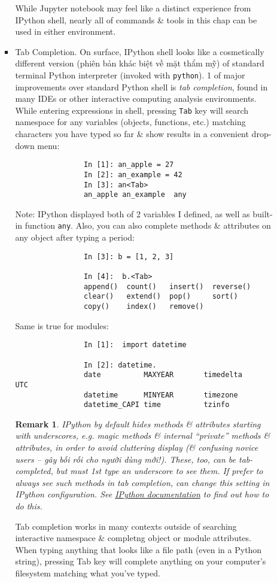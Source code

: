 \documentclass{article}
\newtheorem{remark}{Remark}
\begin{document}
\begin{itemize}
\begin{itemize}
\begin{itemize}
			While Jupyter notebook may feel like a distinct experience from IPython shell, nearly all of commands \& tools in this chap can be used in either environment.
			\item {\sf Tab Completion.} On surface, IPython shell looks like a cosmetically different version (phiên bản khác biệt về mặt thẩm mỹ) of standard terminal Python interpreter (invoked with {\tt python}). 1 of major improvements over standard Python shell is {\it tab completion}, found in many IDEs or other interactive computing analysis environments. While entering expressions in shell, pressing {\tt Tab} key will search namespace for any variables (objects, functions, etc.) matching characters you have typed so far \& show results in a convenient drop-down menu:
			\begin{verbatim}
				In [1]: an_apple = 27
				In [2]: an_example = 42
				In [3]: an<Tab>
				an_apple an_example  any
			\end{verbatim}
			Note: IPython displayed both of 2 variables I defined, as well as built-in function {\tt any}. Also, you can also complete methods \& attributes on any object after typing a period:
			\begin{verbatim}
				In [3]: b = [1, 2, 3]
				
				In [4]:  b.<Tab>
				append()  count()   insert()  reverse()
				clear()   extend()  pop()     sort()   
				copy()    index()   remove()           
			\end{verbatim}
			Same is true for modules:
			\begin{verbatim}
				In [1]:  import datetime
				
				In [2]: datetime.
				date          MAXYEAR       timedelta     UTC          
				datetime      MINYEAR       timezone                   
				datetime_CAPI time          tzinfo                     
			\end{verbatim}
			
			\begin{remark}
				IPython by default hides methods \& attributes starting with underscores, e.g. magic methods \& internal ``private'' methods \& attributes, in order to avoid cluttering display (\& confusing novice users -- gây bối rối cho người dùng mới!). These, too, can be tab-completed, but must 1st type an underscore to see them. If prefer to always see such methods in tab completion, can change this setting in IPython configuration. See \href{https://ipython.readthedocs.io}{IPython documentation} to find out how to do this.
			\end{remark}
			Tab completion works in many contexts outside of searching interactive namespace \& completng object or module attributes. When typing anything that looks like a file path (even in a Python string), pressing Tab key will complete anything on your computer's filesystem matching what you've typed.
			

\end{itemize}
\end{itemize}
\end{itemize}
\end{document}
